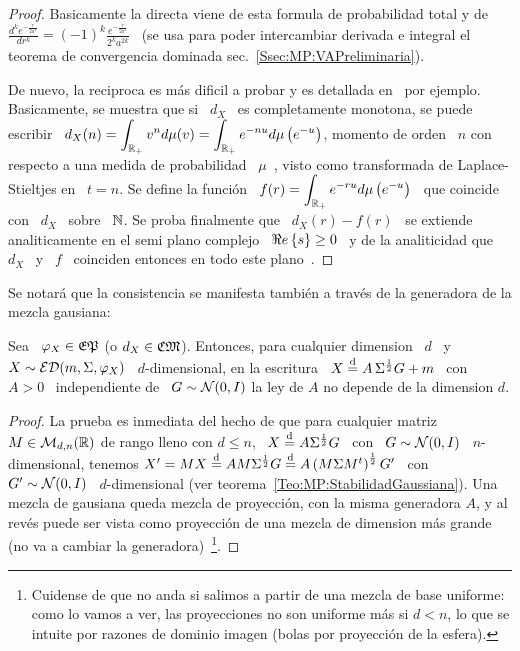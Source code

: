 \begin{proof}
  Basicamente la  directa viene  de esta  formula de probabilidad  total y  de \
  $\displaystyle     \frac{d^k    e^{-\frac{r}{2    a^2}}}{dr^k}     =    (-1)^k
  \frac{e^{-\frac{r}{2 a^2}}}{2^k  a^{2 k}}$ \  (se usa para  poder intercambiar
  derivada    e     integral    el    teorema     de    convergencia    dominada
  sec.~\ref{Ssec:MP:VAPreliminaria}).

  De  nuevo,   la  reciproca   es  m\'as  dificil   a  probar  y   es  detallada
  en~\cite[\S~12]{Wid46} por ejemplo.  Basicamente, se  muestra que si \ $d_X$ \
  es  completamente  monotona,  se  puede  escribir \  $\displaystyle  d_X(n)  =
  \int_{\mathbb{R}_+}  v^n  d\mu(v)  =  \int_{\mathbb{R}_+}  e^{-n  u}  d\mu\left(  e^{-u}
  \right)$, momento de  orden \ $n$ con respecto a una  medida de probabilidad \
  $\mu$~\cite{Hau21:I, Hau21:II},  visto como transformada  de Laplace-Stieltjes
  en \ $t  = n$.  Se define la funci\'on \  $\displaystyle f(r) = \int_{\mathbb{R}_+}
  e^{- r  u} d\mu\left( e^{-u}  \right)$ \  que coincide con  \ $d_X$ \  sobre \
  $\mathbb{N}$.   Se  proba   finalmente  que  \  $d_X(r)  -   f(r)$  \  se  extiende
  analiticamente  en el  semi  plano  complejo \  $\Re e \left\{ s \right\}  \ge 0$  \  y de  la
  analiticidad  que  \ $d_X$  \  y  \ $f$  \  coinciden  entonces  en todo  este
  plano~\cite{Car21, CarKro05}.
\end{proof}

Se  notar\'a  que  la consistencia  se  manifesta  tambi\'en  a trav\'es  de  la
generadora de la mezcla gausiana:
%
\begin{lema}\label{Lem:MP:AIndependienteD}
  Sea  \ $\varphi_X  \in  \mathfrak{EP}$ (o  $d_X  \in \mathfrak{CM}$).  Entonces, para  cualquier
  dimension \ $d$ \ y  $X \sim \mathcal{ED}(m,\Sigma,\varphi_X)$ \ $d$-dimensional, en la
  escritura  \ $X  \stackrel{\mathrm{d}}{=}  A \,  \Sigma^{\frac12} G  +  m$ \  con  \ $A  > 0$  \
  independiente de \ $G  \sim \mathcal{N}(0,I)$ la ley de $A$ no  depende de la dimension
  $d$.
\end{lema}
%
\begin{proof}
  La  prueba  es  inmediata del  hecho  de  que  para  cualquier matriz  $M  \in
  \mathcal{M}_{d,n}(\mathbb{R})$ de rango lleno con $d  \le n$, \ $X \stackrel{\mathrm{d}}{=} A \Sigma^{\frac12}
  G $ \ con  \ $G \sim \mathcal{N}(0,I)$ \ $n$-dimensional, tenemos $X' =  M X \stackrel{\mathrm{d}}{=} A M
  \Sigma^{\frac12} G \stackrel{\mathrm{d}}{=} A \left( M  \Sigma M^t \right)^{\frac12} G'$ \ con \
  $G'         \sim        \mathcal{N}(0,I)$         \         $d$-dimensional        (ver
  teorema~\ref{Teo:MP:StabilidadGaussiana}). Una mezcla de gausiana queda mezcla
  de proyecci\'on,  con la misma  generadora $A$, y  al rev\'es puede  ser vista
  como proyecci\'on de una mezcla de  dimension m\'as grande (no va a cambiar la
  generadora)~\footnote{Cuidense  de que  no anda  si  salimos a  partir de  una
    mezcla  de base  uniforme: como  lo  vamos a  ver, las  proyecciones no  son
    uniforme m\'as si $d  < n$, lo que se intuite por  razones de dominio imagen
    (bolas por proyecci\'on de la esfera).}.
\end{proof}

